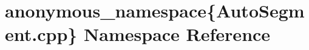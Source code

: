 \hypertarget{namespaceanonymous__namespace_02AutoSegment_8cpp_03}{\section{anonymous\-\_\-namespace\{Auto\-Segment.\-cpp\} Namespace Reference}
\label{namespaceanonymous__namespace_02AutoSegment_8cpp_03}
}
